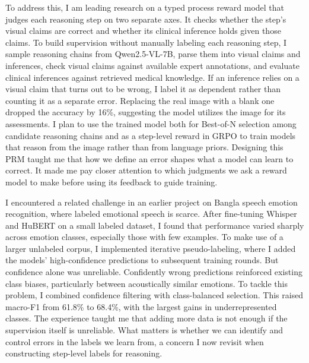 \documentclass{article}
\begin{document}
To address this, I am leading research on a typed process reward model that judges each reasoning step on two separate axes. It checks whether the step's visual claims are correct and whether its clinical inference holds given those claims. To build supervision without manually labeling each reasoning step, I sample reasoning chains from Qwen2.5-VL-7B, parse them into visual claims and inferences, check visual claims against available expert annotations, and evaluate clinical inferences against retrieved medical knowledge. If an inference relies on a visual claim that turns out to be wrong, I label it as dependent rather than counting it as a separate error. Replacing the real image with a blank one dropped the accuracy by 16\%, suggesting the model utilizes the image for its assessments. I plan to use the trained model both for Best-of-N selection among candidate reasoning chains and as a step-level reward in GRPO to train models that reason from the image rather than from language priors. Designing this PRM taught me that how we define an error shapes what a model can learn to correct. It made me pay closer attention to which judgments we ask a reward model to make before using its feedback to guide training.


I encountered a related challenge in an earlier project on Bangla speech emotion recognition, where labeled emotional speech is scarce. After fine-tuning Whisper and HuBERT on a small labeled dataset, I found that performance varied sharply across emotion classes, especially those with few examples. To make use of a larger unlabeled corpus, I implemented iterative pseudo-labeling, where I added the models' high-confidence predictions to subsequent training rounds. But confidence alone was unreliable. Confidently wrong predictions reinforced existing class biases, particularly between acoustically similar emotions. To tackle this problem, I combined confidence filtering with class-balanced selection. This raised macro-F1 from 61.8\% to 68.4\%, with the largest gains in underrepresented classes. The experience taught me that adding more data is not enough if the supervision itself is unreliable. What matters is whether we can identify and control errors in the labels we learn from, a concern I now revisit when constructing step-level labels for reasoning.

\end{document}
